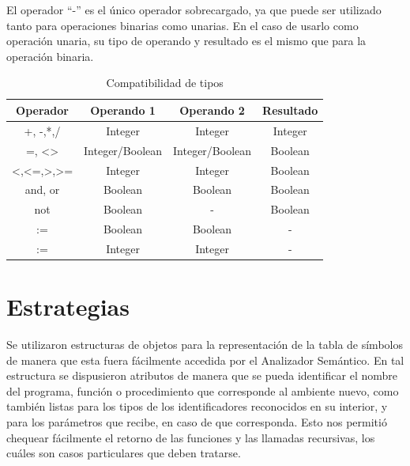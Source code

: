 El operador ``-'' es el único operador sobrecargado, ya que puede ser utilizado tanto para operaciones binarias como unarias. En el caso de usarlo como operación unaria, su tipo de operando y resultado es el mismo que para la operación binaria. 
\begin{table}[H]
\centering
\begin{tabular}{|c|c|c|c|}
\hline
Operador                                                & Operando 1      & Operando 2      & Resultado \\ \hline
+, -,*,/                                                & Integer         & Integer         & Integer   \\ \hline
=, \textless{}\textgreater{}                            & Integer/Boolean & Integer/Boolean & Boolean   \\ \hline
\textless{},\textless{}=,\textgreater{},\textgreater{}= & Integer         & Integer         & Boolean   \\ \hline
and, or                                                 & Boolean         & Boolean         & Boolean   \\ \hline
not                                                     & Boolean         & -               & Boolean   \\ \hline
:=                                                      & Boolean         & Boolean         & -         \\ \hline
:=                                                      & Integer         & Integer         & -         \\ \hline
\end{tabular}
\caption{Compatibilidad de tipos}
\label{tab:compatibilidad}
\end{table}

\section{Estrategias}
Se utilizaron estructuras de objetos para la representación de la tabla de símbolos de manera que esta fuera fácilmente accedida por el Analizador Semántico. En tal estructura se dispusieron atributos de manera que se pueda identificar el nombre del programa, función o procedimiento que corresponde al ambiente nuevo, como también listas para los tipos de los identificadores reconocidos en su interior, y para los parámetros que recibe, en caso de que corresponda. Esto nos permitió chequear fácilmente el retorno de las funciones y las llamadas recursivas, los cuáles son casos particulares que deben tratarse.

